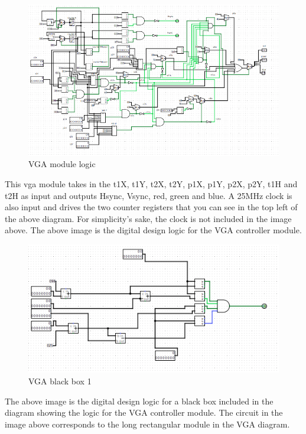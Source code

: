 \documentclass{article}
\begin{document}
\begin{figure}[H]
	\begin{center}
		\includegraphics[width=1\textwidth]{vgaOut} 
		\caption{VGA module logic}
	\end{center}
\end{figure}

This vga module takes in the t1X, t1Y, t2X, t2Y, p1X, p1Y, p2X, p2Y, t1H and t2H as input and outputs Hsync, Vsync, red, green and blue. A 25MHz clock is also input and drives the two counter registers that you can see in the top left of the above diagram.  For simplicity's sake, the clock is not included in the image above. The above image is the digital design logic for the VGA controller module.

\begin{figure}[H]
	\begin{center}
		\includegraphics[width=1\textwidth]{vgaBlackBox} 
		\caption{VGA black box 1}
	\end{center}
\end{figure}

The above image is the digital design logic for a black box included in the diagram showing the logic for the VGA controller module.  The circuit in the image above corresponds to the long rectangular module in the VGA diagram.
\end{document}
